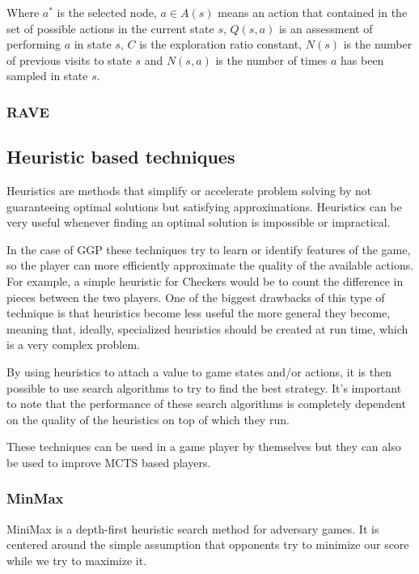 Where $a^{*}$ is the selected node, $a \in A(s)$ means an action that contained in the set of possible actions in the current state $s$, $Q(s,a)$ is an assessment of performing $a$ in state $s$, $C$ is the exploration ratio constant, $N(s)$ is the number of previous visits to state $s$ and $N(s,a)$ is the number of times $a$ has been sampled in state $s$.

\subsubsection{RAVE}

\subsection{Heuristic based techniques}
Heuristics are methods that simplify or accelerate problem solving by not guaranteeing optimal solutions but satisfying approximations. Heuristics can be very useful whenever finding an optimal solution is impossible or impractical.

In the case of \gls{GGP} these techniques try to learn or identify features of the game, so the player can more efficiently approximate the quality of the available actions. For example, a simple heuristic for Checkers would be to count the difference in pieces between the two players. One of the biggest drawbacks of this type of technique is that heuristics become less useful the more general they become, meaning that, ideally, specialized heuristics should be created at run time, which is a very complex problem.

By using heuristics to attach a value to game states and/or actions, it is then possible to use search algorithms to try to find the best strategy.
It's important to note that the performance of these search algorithms is completely dependent on the quality of the heuristics on top of which they run.

These techniques can be used in a game player by themselves but they can also be used to improve \gls{MCTS} based players.

\subsubsection{MinMax}

MiniMax is a depth-first heuristic search method for adversary games.
It is centered around the simple assumption that opponents try to minimize our score while we try to maximize it. 

